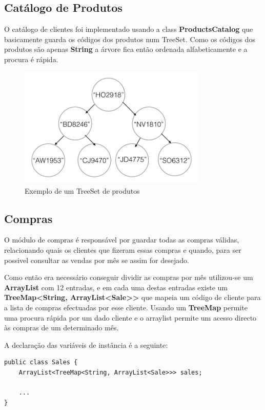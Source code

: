 \documentclass[10pt] {article}
\begin{document}
\newpage
\subsection{Catálogo de Produtos}

O catálogo de clientes foi implementado usando a class  \textbf{ProductsCatalog} que basicamente guarda os códigos
dos produtos num TreeSet. Como os códigos dos produtos são apenas \textbf{String} a árvore fica então ordenada
alfabeticamente e a procura é rápida.

\begin{figure}[ht!]
\centering
\includegraphics[width=90mm]{catprodutos.png}
\caption{Exemplo de um TreeSet de produtos}
\label{fig:catprodutos}
\end{figure}

\subsection{Compras}

O módulo de compras é responsável por guardar todas as compras válidas, relacionando quais os clientes que fizeram
essas compras e quando, para ser possivel consultar as vendas por mês se assim for desejado.

Como então era necessário conseguir dividir as compras por mês utilizou-se um \textbf{ArrayList} com 12 entradas, e
em cada uma destas entradas existe um \textbf{TreeMap\textless String, ArrayList\textless Sale\textgreater\textgreater} que
mapeia um código de cliente para a lista de compras efectuadas por esse cliente. Usando um \textbf{TreeMap} permite uma
procura rápida por um dado cliente e o arraylist permite um acesso directo às compras de um determinado mês.

A declaração das variáveis de instância é a seguinte:

\begin{lstlisting}
public class Sales {
	ArrayList<TreeMap<String, ArrayList<Sale>>> sales;

	...
}
\end{lstlisting}
\end{document}
